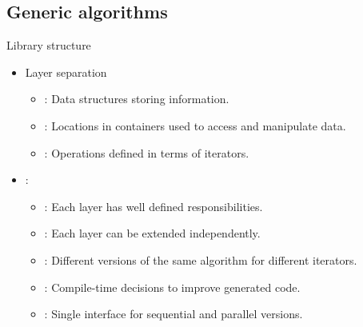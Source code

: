 \subsection{Generic algorithms}

\begin{frame}[t,fragile]{Library structure}
\begin{itemize}
  \item Layer separation
    \begin{itemize}
      \item {}: 
            Data structures storing information.
      \item {}: 
            Locations in containers used to access and manipulate data.
      \item {}: 
            Operations defined in terms of iterators.
    \end{itemize}

  \item {}:
    \begin{itemize}
      \item {}:
            Each layer has well defined responsibilities.
      \item {}:
            Each layer can be extended independently.
      \item {}:
            Different versions of the same algorithm for different iterators.
      \item {}:
            Compile-time decisions to improve generated code.
      \item {}:
            Single interface for sequential and parallel versions.
    \end{itemize}
\end{itemize}
\end{frame}

